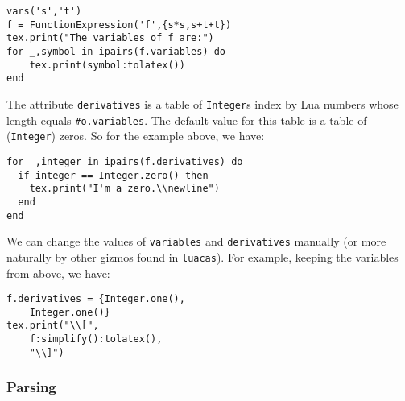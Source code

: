 \documentclass{article}
\begin{document}
\begin{codebox}
    \begin{verbatim}
vars('s','t')
f = FunctionExpression('f',{s*s,s+t+t})
tex.print("The variables of f are:")
for _,symbol in ipairs(f.variables) do 
    tex.print(symbol:tolatex())
end
    \end{verbatim}
    \tcblower
{}
\end{codebox}
The attribute \texttt{derivatives} is a table of \texttt{Integer}s index by Lua numbers whose length equals \texttt{#o.variables}. The default value for this table is a table of (\texttt{Integer}) zeros. So for the example above, we have:
\begin{codebox}
    \begin{verbatim}
for _,integer in ipairs(f.derivatives) do 
  if integer == Integer.zero() then
    tex.print("I'm a zero.\\newline")
  end
end
\end{verbatim}
\tcblower
{}
\end{codebox}
We can change the values of \texttt{variables} and \texttt{derivatives} manually (or more naturally by other gizmos found in \texttt{luacas}). For example, keeping the variables from above, we have:
\begin{codebox}
    \begin{verbatim}
f.derivatives = {Integer.one(),
    Integer.one()}
tex.print("\\[",
    f:simplify():tolatex(),
    "\\]")
\end{verbatim}
\tcblower
{}
\end{codebox}

\subsubsection*{Parsing}
\end{document}
